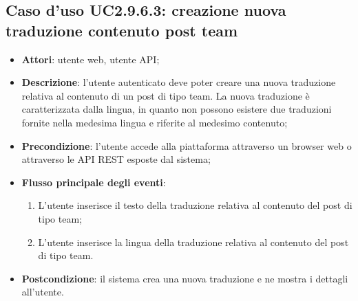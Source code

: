 \subsection{Caso d'uso UC2.9.6.3: creazione nuova traduzione contenuto post team}
\begin{itemize}
\item \textbf{Attori}: utente web, utente API;
\item \textbf{Descrizione}: l'utente autenticato deve poter creare una nuova traduzione relativa al contenuto di un post di tipo team. La nuova traduzione è caratterizzata dalla lingua, in quanto non possono esistere due traduzioni fornite nella medesima lingua e riferite al medesimo contenuto; 
      \item \textbf{Precondizione}: l'utente accede alla piattaforma attraverso un browser web o attraverso le API REST esposte dal sistema;

        \item \textbf{Flusso principale degli eventi}:
          \begin{enumerate}
          \item L'utente inserisce il testo della traduzione relativa al contenuto del post di tipo team;
          \item L'utente inserisce la lingua della traduzione relativa al contenuto del post di tipo team.

      \end{enumerate}
    \item \textbf{Postcondizione}: il sistema crea una nuova traduzione e ne mostra i dettagli all'utente.
  \end{itemize}
	
	
\hypertarget{UC2.9.6.4}{}
